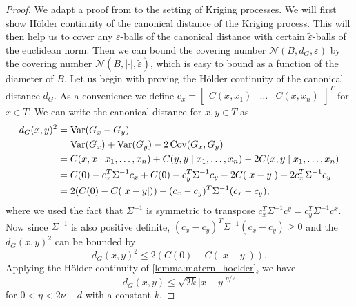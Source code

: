 \begin{proof}
We adapt a proof from \cite{ernst2020integrability} to the setting of Kriging processes.
We will first show Hölder continuity of the canonical distance of the Kriging process. This will then help us to cover any $\varepsilon$-balls of the canonical distance with certain $\tilde{\varepsilon}$-balls of the euclidean norm. Then we can bound the covering number $\mathcal{N}(B,d_{G},\varepsilon)$ by the covering number $\mathcal{N}(B, \lvert \cdot \rvert, \tilde{\varepsilon})$, which is easy to bound as a function of the diameter of $B$. 
%
%
Let us begin with proving the Hölder continuity of the canonical distance $d_{G}$. 
As a convenience we define $c_{x}=\begin{bmatrix}C(x,x_{1}) & \dots & C(x,x_{n}) \end{bmatrix}^{T}$ for $x \in T$.
We can write the canonical distance for $x,y \in T$ as
\begin{align*}
    d_{G}(x,y)^2 &= \operatorname{Var}(G_{x}-G_{y})\\
    &= \operatorname{Var}(G_{x}) + \operatorname{Var}(G_{y}) - 2 \operatorname{Cov}(G_{x},G_{y})\\
    &= C(x,x \mid x_{1}, \dots, x_{n}) + C(y,y \mid x_{1}, \dots, x_{n}) -2 C(x,y \mid x_{1}, \dots, x_{n})\\
    &= C(0)- c_{x}^{T}\Sigma^{-1}c_{x}+ C(0)- c_{y}^{T} \Sigma^{-1} c_{y} 
    - 2C(\lvert x-y \rvert)+2 c_{x}^{T} \Sigma^{-1} c_{y}\\
    &= 2(C(0)-C(\lvert x-y \rvert)) -(c_{x}-c_{y})^{T}\Sigma^{-1}(c_{x}-c_{y}),
\end{align*}
where we used the fact that $\Sigma^{-1}$ is symmetric to transpose \( c_{x}^{T} \Sigma^{-1} c^{y} = c_{y}^{T} \Sigma^{-1} c^{x}  \).
Now since $\Sigma^{-1}$ is also positive definite, \( (c_{x}-c_{y})^{T}\Sigma^{-1}(c_{x}-c_{y}) \geq 0 \)
and the $d_{G}(x,y)^2$ can be bounded by
\[
    d_{G}(x,y)^2 \leq 2(C(0)-C(\lvert x-y \rvert)).
\]
Applying the Hölder continuity of \cref{lemma:matern_hoelder}, we have
\[
    d_{G}(x,y) \leq \sqrt{2k} \lvert x-y \rvert^{\eta/2}
\]
for $0 < \eta < 2 \nu -d$ with a constant $k$.


\end{proof}
